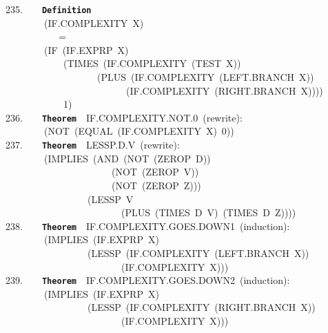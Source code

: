\documentclass[11pt]{book}
\newenvironment{pubasis}{\begin{flushleft}\ttfamily\small}{\normalsize\rmfamily\end{flushleft}}
\newcommand{\axiomordefinition}[1]{\vspace{6pt}\texttt{\textbf{#1}}}
\begin{document}
\begin{pubasis}
235.~~~~\axiomordefinition{Definition}\\
~~~~~~~~(IF.COM\-PLEX\-I\-TY~X)\\
~~~~~~~~~~~=\\
~~~~~~~~(IF~(IF.EXPRP~X)\\
~~~~~~~~~~~~(TIMES~(IF.COM\-PLEX\-I\-TY~(TEST~X))\\
~~~~~~~~~~~~~~~~~~~(PLUS~(IF.COM\-PLEX\-I\-TY~(LEFT.BRANCH~X))\\
~~~~~~~~~~~~~~~~~~~~~~~~~(IF.COM\-PLEX\-I\-TY~(RIGHT.BRANCH~X))))\\
~~~~~~~~~~~~1)\\

236.~~~~\axiomordefinition{Theorem}~~IF.COM\-PLEX\-I\-TY.NOT.0~(rewrite):\\
~~~~~~~~(NOT~(EQUAL~(IF.COM\-PLEX\-I\-TY~X)~0))\\

237.~~~~\axiomordefinition{Theorem}~~LESSP.D.V~(rewrite):\\
~~~~~~~~(IMPLIES~(AND~(NOT~(ZEROP~D))\\
~~~~~~~~~~~~~~~~~~~~~~(NOT~(ZEROP~V))\\
~~~~~~~~~~~~~~~~~~~~~~(NOT~(ZEROP~Z)))\\
~~~~~~~~~~~~~~~~~(LESSP~V\\
~~~~~~~~~~~~~~~~~~~~~~~~(PLUS~(TIMES~D~V)~(TIMES~D~Z))))\\

238.~~~~\axiomordefinition{Theorem}~~IF.COM\-PLEX\-I\-TY.GOES.DOWN1~(induction):\\
~~~~~~~~(IMPLIES~(IF.EXPRP~X)\\
~~~~~~~~~~~~~~~~~(LESSP~(IF.COM\-PLEX\-I\-TY~(LEFT.BRANCH~X))\\
~~~~~~~~~~~~~~~~~~~~~~~~(IF.COM\-PLEX\-I\-TY~X)))\\

239.~~~~\axiomordefinition{Theorem}~~IF.COM\-PLEX\-I\-TY.GOES.DOWN2~(induction):\\
~~~~~~~~(IMPLIES~(IF.EXPRP~X)\\
~~~~~~~~~~~~~~~~~(LESSP~(IF.COM\-PLEX\-I\-TY~(RIGHT.BRANCH~X))\\
~~~~~~~~~~~~~~~~~~~~~~~~(IF.COM\-PLEX\-I\-TY~X)))\\


\end{pubasis}
\end{document}
